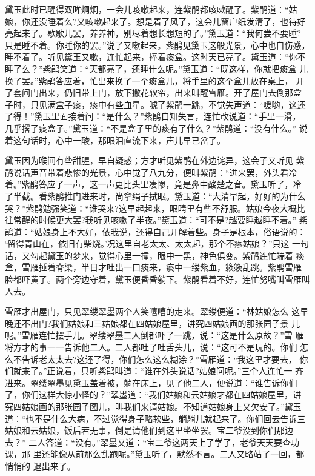 黛玉此时已醒得双眸炯炯，一会儿咳嗽起来，连紫鹃都咳嗽醒了。紫鹃道：“姑
娘，你还没睡着么?又咳嗽起来了。想是着了风了，这会儿窗户纸发清了，也待好
亮起来了。歇歇儿罢，养养神，别尽着想长想短的了。”黛玉道：“我何尝不要睡?
只是睡不着。你睡你的罢。”说了又嗽起来。紫鹃见黛玉这般光景，心中也自伤感，
睡不着了。听见黛玉又嗽，连忙起来，捧着痰盒。这时天已亮了。黛玉道：“你不
睡了么？”紫鹃笑道：“天都亮了，还睡什么呢。”黛玉道：“既这样，你就把痰盒
儿换了罢。”紫鹃答应着，忙出来换了一个痰盒儿，将手里的这个盒儿放在桌上，
开了套间门出来，仍旧带上门，放下撒花软帘，出来叫醒雪雁。开了屋门去倒那盒
子时，只见满盒子痰，痰中有些血星。唬了紫鹃一跳，不觉失声道：“嗳哟，这还
了得！”黛玉里面接着问：“是什么？”紫鹃自知失言，连忙改说道：“手里一滑，
几乎撂了痰盒子。”黛玉道：“不是盒子里的痰有了什么？”紫鹃道：“没有什么。”
说着这句话时，心中一酸，那眼泪直流下来，声儿早已岔了。

黛玉因为喉间有些甜腥，早自疑惑；方才听见紫鹃在外边诧异，这会子又听见
紫鹃说话声音带着悲惨的光景，心中觉了八九分，便叫紫鹃：“进来罢，外头看冷
着。”紫鹃答应了一声，这一声更比头里凄惨，竟是鼻中酸楚之音。黛玉听了，冷
了半截。看紫鹃推门进来时，尚拿绢子拭眼。黛玉道：“大清早起，好好的为什么
哭？”紫鹃勉强笑道：“谁哭来?这早起起来，眼睛里有些不舒服。姑娘今夜大概比
往常醒的时候更大罢?我听见咳嗽了半夜。”黛玉道：“可不是?越要睡越睡不着。”
紫鹃道：“姑娘身上不大好，依我说，还得自己开解着些。身子是根本，俗语说的：
‘留得青山在，依旧有柴烧。’况这里自老太太、太太起，那个不疼姑娘？”只这
一句话，又勾起黛玉的梦来，觉得心里一撞，眼中一黑，神色俱变。紫鹃连忙端着
痰盒，雪雁捶着脊梁，半日才吐出一口痰来，痰中一缕紫血，簌簌乱跳。紫鹃雪雁
脸都吓黄了。两个旁边守着，黛玉便昏昏躺下。紫鹃看着不好，连忙努嘴叫雪雁叫
人去。

雪雁才出屋门，只见翠缕翠墨两个人笑嘻嘻的走来。翠缕便道：“林姑娘怎么
这早晚还不出门?我们姑娘和三姑娘都在四姑娘屋里，讲究四姑娘画的那张园子景
儿呢。”雪雁连忙摆手儿。翠缕翠墨二人倒都吓了一跳，说：“这是什么原故？”雪
雁将方才的事一一告诉他二人。二人都吐了吐舌头儿，说：“这可不是玩的。你们
怎么不告诉老太太去?这还了得，你们怎么这么糊涂？”雪雁道：“我这里才要去，
你们就来了。”正说着，只听紫鹃叫道：“谁在外头说话?姑娘问呢。”三个人连忙一
齐进来。翠缕翠墨见黛玉盖着被，躺在床上，见了他二人，便说道：“谁告诉你们
了，你们这样大惊小怪的？”翠墨道：“我们姑娘和云姑娘才都在四姑娘屋里，讲
究四姑娘画的那张园子图儿，叫我们来请姑娘。不知道姑娘身上又欠安了。”黛玉
道：“也不是什么大病，不过觉得身子略软些，躺躺儿就起来了。你们回去告诉三
姑娘和云姑娘，饭后若无事，倒是请他们到这里坐坐罢。宝二爷没到你们那边去？”
二人答道：“没有。”翠墨又道：“宝二爷这两天上了学了，老爷天天要查功课，那
里还能像从前那么乱跑呢。”黛玉听了，默然不言。二人又略站了一回，都悄悄的
退出来了。

